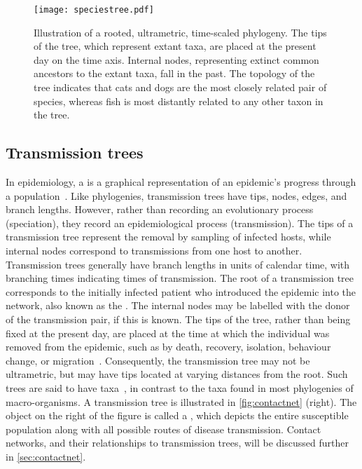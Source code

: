 \begin{figure}[ht]
  \centering
  \texttt{[image: speciestree.pdf]}
  \caption[Illustration of a rooted, ultrametric, time-scaled phylogeny.]
    {Illustration of a rooted, ultrametric, time-scaled phylogeny. The tips of
      the tree, which represent extant taxa, are placed at the present day on
      the time axis. Internal nodes, representing extinct common ancestors to
      the extant taxa, fall in the past. The topology of the tree indicates
      that cats and dogs are the most closely related pair of species, whereas
      fish is most distantly related to any other taxon in the tree.}
  \label{fig:speciestree}
\end{figure}

\subsection{Transmission trees}
\label{subsec:tt}

In epidemiology, a  is a graphical representation of an
epidemic's progress through a population~\autocite{ypma2013relating}. Like
phylogenies, transmission trees have tips, nodes, edges, and branch lengths.
However, rather than recording an evolutionary process (speciation), they
record an epidemiological process (transmission). The tips of a transmission
tree represent the removal by sampling of infected hosts, while internal nodes
correspond to transmissions from one host to another. Transmission trees
generally have branch lengths in units of calendar time, with branching times
indicating times of transmission. The root of a transmission tree corresponds
to the initially infected patient who introduced the epidemic into the network,
also known as the . The internal nodes may be labelled with
the donor of the transmission pair, if this is known. The tips of the tree,
rather than being fixed at the present day, are placed at the time at which the
individual was removed from the epidemic, such as by death, recovery,
isolation, behaviour change, or migration~\autocite{stadler2013uncovering}.
Consequently, the transmission tree may not be ultrametric, but may have tips
located at varying distances from the root. Such trees are said to have
 taxa~\autocite{drummond2003measurably}, in contrast to
the  taxa found in most phylogenies of macro-organisms. A
transmission tree is illustrated in \cref{fig:contactnet} (right). 
The object on the right of the figure is called a , which depicts the entire susceptible population along with all
possible routes of disease transmission. Contact networks, and their
relationships to transmission trees, will be discussed further in
\cref{sec:contactnet}.

